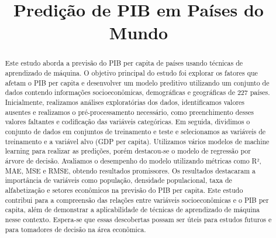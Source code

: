 \documentclass[conference]{IEEEtran}
\begin{document}
\title{Predição de PIB em Países do Mundo
}

\author{
}

\maketitle

\renewcommand{\abstractname}{Resumo}

\begin{abstract}
Este estudo aborda a previsão do PIB per capita de países usando técnicas de aprendizado de máquina. O objetivo principal do estudo foi explorar os fatores que afetam o PIB per capita e desenvolver um modelo preditivo utilizando um conjunto de dados contendo informações socioeconômicas, demográficas e geográficas de 227 países. Inicialmente, realizamos análises exploratórias dos dados, identificamos valores ausentes e realizamos o pré-processamento necessário, como preenchimento desses valores faltantes e codificação das variáveis categóricas. Em seguida, dividimos o conjunto de dados em conjuntos de treinamento e teste e selecionamos as variáveis de treinamento e a variável alvo (GDP per capita). Utilizamos vários modelos de machine learning para realizar as predições, porém destacou-se o modelo de regressão por árvore de decisão. Avaliamos o desempenho do modelo utilizando métricas como R², MAE, MSE e RMSE, obtendo resultados promissores. Os resultados destacaram a importância de variáveis como população, densidade populacional, taxa de alfabetização e setores econômicos na previsão do PIB per capita. Este estudo contribui para a compreensão das relações entre variáveis socioeconômicas e o PIB per capita, além de demonstrar a aplicabilidade de técnicas de aprendizado de máquina nesse contexto. Espera-se que essas descobertas possam ser úteis para estudos futuros e para tomadores de decisão na área econômica.
\end{abstract}
\end{document}
